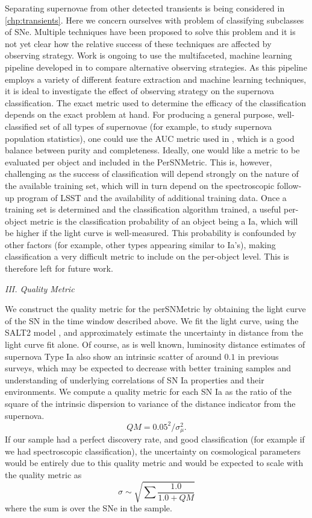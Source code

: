 Separating supernovae from other detected transients is being considered in
\autoref{chp:transients}. Here we concern ourselves with problem of classifying subclasses of
SNe. Multiple techniques have been proposed to solve this problem \citep{Frieman2008,sako2008, kessler2010b, 
ishida2012, sako2014} and it is not yet clear how the
relative success of these techniques are affected by observing strategy. Work is ongoing to use the
multifaceted, machine learning pipeline developed in \citet{Lochner2016} to compare alternative
observing strategies. As this pipeline employs a variety of different feature extraction and machine learning
techniques, it is ideal to investigate the effect of observing strategy on the supernova classification. The exact 
metric used to determine the efficacy of the classification depends
on the exact problem at hand. For producing a general purpose, well-classified set of all types of
supernovae (for example, to study supernova population statistics), one could use the AUC metric
used in \citet{Lochner2016}, which is a good balance between purity and completeness. Ideally,
one would like a metric to be evaluated per object and included in the PerSNMetric. This is,
however, challenging as the success of classification will depend strongly on the nature of the
available training set, which will in turn depend on the spectroscopic follow-up program of LSST
and the availability of additional training data. Once a training set is determined and the
classification algorithm trained, a useful per-object metric is the classification probability of an
object being a Ia, which will be higher if the light curve is well-measured. This probability is
confounded by other factors (for example, other types appearing similar to Ia's), making
classification a very difficult metric to include on the per-object level. This is therefore left for future work.


\emph{III. Quality Metric}

We construct the quality metric for the perSNMetric by obtaining the
light curve of the SN in the time window described above. We fit the
light curve, using the SALT2 model \citep{Guy2007, Mosher2014}, and approximately estimate the uncertainty in
distance from
the light curve fit alone. Of course, as is well known, luminosity
distance estimates of supernova Type Ia also show an intrinsic scatter
of around $0.1$ in previous surveys, which may be expected to decrease
with better training samples and understanding of underlying
correlations of SN Ia properties and their environments. We compute a
quality metric for each SN Ia as the ratio of the square of the
intrinsic dispersion to variance of the distance indicator from the supernova. 
$$ QM = 0.05^2/\sigma^2_{\mu}.$$ If our sample had a perfect discovery rate, and good classification (for example if we had spectroscopic classification), the uncertainty on
cosmological parameters would be entirely due to this quality metric and would be expected to scale with the quality metric as 
$$\sigma \sim \sqrt{\sum{\frac{1.0}{1.0 + QM}}}$$
where the sum is over the SNe in the sample.

